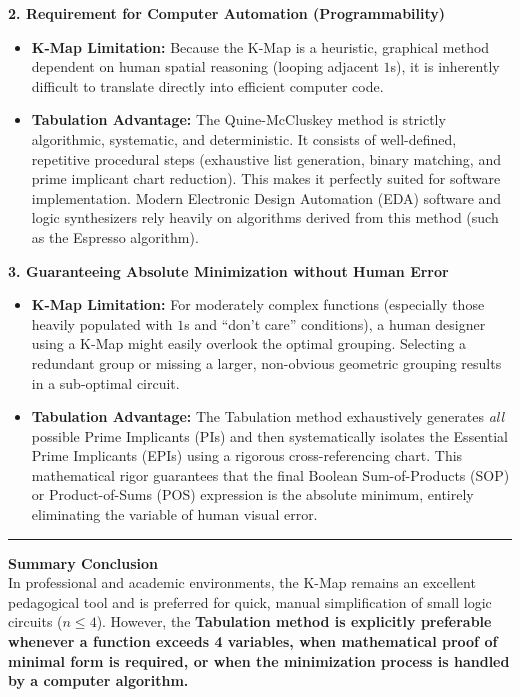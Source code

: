\documentclass[12pt,a3paper]{article}
\begin{document}
\begin{enumerate}
\begin{tcolorbox}[enhanced,breakable,ansbox,colback=cC!4,colframe=cC,boxrule=0.8pt,arc=5pt,title={\textbf{Answer}},fonttitle=\bfseries\color{white},colbacktitle=cC]
\vspace{0.5em}
\textbf{2. Requirement for Computer Automation (Programmability)}
\begin{itemize}
    \item \textbf{K-Map Limitation:} Because the K-Map is a heuristic, graphical method dependent on human spatial reasoning (looping adjacent $1$s), it is inherently difficult to translate directly into efficient computer code.
    \item \textbf{Tabulation Advantage:} The Quine-McCluskey method is strictly algorithmic, systematic, and deterministic. It consists of well-defined, repetitive procedural steps (exhaustive list generation, binary matching, and prime implicant chart reduction). This makes it perfectly suited for software implementation. Modern Electronic Design Automation (EDA) software and logic synthesizers rely heavily on algorithms derived from this method (such as the Espresso algorithm).
\end{itemize}

\vspace{0.5em}
\textbf{3. Guaranteeing Absolute Minimization without Human Error}
\begin{itemize}
    \item \textbf{K-Map Limitation:} For moderately complex functions (especially those heavily populated with $1$s and ``don't care'' conditions), a human designer using a K-Map might easily overlook the optimal grouping. Selecting a redundant group or missing a larger, non-obvious geometric grouping results in a sub-optimal circuit.
    \item \textbf{Tabulation Advantage:} The Tabulation method exhaustively generates \textit{all} possible Prime Implicants (PIs) and then systematically isolates the Essential Prime Implicants (EPIs) using a rigorous cross-referencing chart. This mathematical rigor guarantees that the final Boolean Sum-of-Products (SOP) or Product-of-Sums (POS) expression is the absolute minimum, entirely eliminating the variable of human visual error.
\end{itemize}

\vspace{1em}
\rule{\textwidth}{0.4pt}
\vspace{0.5em}
\textbf{Summary Conclusion} \\
In professional and academic environments, the K-Map remains an excellent pedagogical tool and is preferred for quick, manual simplification of small logic circuits ($n \le 4$). However, the \textcolor{cC}{\textbf{Tabulation method is explicitly preferable whenever a function exceeds 4 variables, when mathematical proof of minimal form is required, or when the minimization process is handled by a computer algorithm.}}


\end{tcolorbox}
\end{enumerate}
\end{document}
